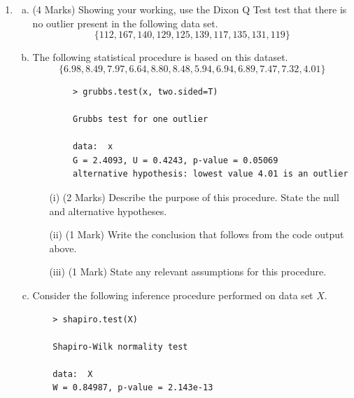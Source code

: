 \documentclass[a4paper,12pt]{article}
\begin{document}
\begin{enumerate}
	\item 
	\begin{enumerate}[(a)]
		\item  (4 Marks) Showing your working, use the Dixon Q Test test that there is no outlier present in the following data set.
		\[ \{112, 167, 140, 129, 125, 139, 117, 135, 131, 119\}\]
	\smallskip
	\item The following statistical procedure is based on this dataset.
\[\{6.98, 8.49, 7.97, 6.64,
			8.80, 8.48, 5.94, 6.94,
			6.89, 7.47, 7.32, 4.01\}
	\]
	
	\begin{framed}
		
		\begin{verbatim}
		> grubbs.test(x, two.sided=T)
		
		Grubbs test for one outlier
		
		data:  x
		G = 2.4093, U = 0.4243, p-value = 0.05069
		alternative hypothesis: lowest value 4.01 is an outlier
		\end{verbatim}
	\end{framed}
	
	\begin{itemize}
		\item[(i)] (2 Marks) Describe the purpose of this procedure. State the null and alternative hypotheses. 
		\item[(ii)] (1 Mark) Write the conclusion that follows from the code output above.
		\item[(iii)] (1 Mark) State any relevant assumptions for this procedure.
	\end{itemize}
\bigskip
\item 
Consider the following inference procedure performed on data set $X$.
\begin{framed}
	\begin{verbatim}
	> shapiro.test(X)
	
	Shapiro-Wilk normality test
	
	data:  X
	W = 0.84987, p-value = 2.143e-13
	
	\end{verbatim}
\end{framed}



\end{enumerate}
\end{enumerate}
\end{document}
